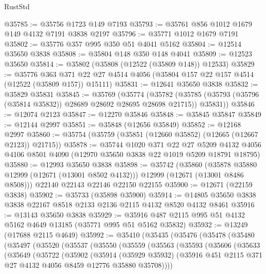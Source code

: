 \begin{lexlean}{RustStd}
\begin{coremodule}
@35785 := @35756 @1723 @149 @7193
@35793 := @35761 @856 @1012 @1679 @149 @4132 @7191 @3838 @2197
@35796 := @35771 @1012 @1679 @7191
@35802 := @35776 @357 @995 @350 @51 @4041 @5162
@35804 := @12514 @35650 @3838
@35808 := @35804 @148 @350 @148 @4041
@35809 := @12523 @35650
@35814 := @35802 (@35808 (@12522 (@35809 @148)) @12533)
@35829 := @35776
    @363
    @371
    @22
    @27
    @4514
    @4056
    (@35804 @157 @22 @157 @4514 (@12522 (@35809 @157)) @15111)
@35831 := @12641 @35650 @3838
@35832 := @35829 @35831
@35845 := @35769
    (@35774
      (@35782 (@35785 (@35793 (@35796 (@35814 @35832)) @28689 @28692 @28695 @28698 @21715)) @35831))
@35846 := @12074 @2123
@35847 := @12270 @35846
@35848 := @35845 @35847
@35849 := @12144 @2997
@35851 := @35848 (@12656 @35849)
@35852 := @12168 @2997
@35860 := @35754 (@35759 (@35851 (@12660 @35852) (@12665 (@12667 @2123)) @21715))
@35878 := @35744
    @1020
    @371
    @22
    @27
    @5209
    @4132
    @4056
    @4106
    @8501
    @4090
    (@12970 @35650 @3838 @22 @1019 @5209 @18791 @18795)
@35880 := @12993 @35650 @3838
@35898 := @35742
    (@35860
      (@35878 @35880 @12999 (@12671 (@13001 @8502 @4132)))
      @12999
      (@12671 (@13001 @8486 @8508)))
    @22140
    @22143
    @22146
    @22150
    @22155
@35900 := @12671 (@22159 @3838)
@35902 := @35733 (@35898 @35900)
@35914 := @14805 @35650 @3838 @3838 @22167 @8518 @2133 @2136 @2115 @4132 @8520 @4132 @8461
@35916 := @13143 @35650 @3838
@35929 := @35916 @487 @2115 @995 @51 @4132 @5162 @4649 @13185 (@35771 @995 @51 @5162 @35832)
@35932 := @13249 (@17688 @2115 @4649)
@35992 := @35410
    (@35435
      (@35476
        (@35478
          (@35480
            (@35497
              (@35520
                (@35537
                  (@35550
                    (@35559
                      (@35563
                        (@35593
                          (@35606
                            (@35633
                              (@35649
                                (@35722
                                  (@35902
                                    (@35914
                                      (@35929 @35932)
                                      (@35916
                                        @451
                                        @2115
                                        @371
                                        @27
                                        @4132
                                        @4056
                                        @8459
                                        @12776
                                        @35880
                                        @35708))))

\end{coremodule}
\end{lexlean}
